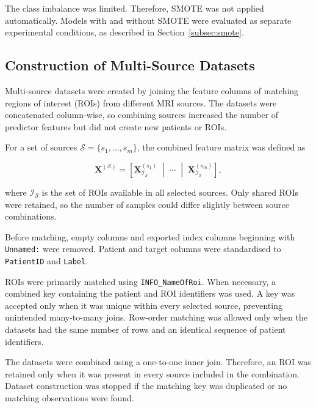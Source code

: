 \documentclass[12pt,twocolumn]{article}
\begin{document}
The class imbalance was limited. Therefore, SMOTE was not applied
automatically. Models with and without SMOTE were evaluated as separate
experimental conditions, as described in
Section~\ref{subsec:smote}.







\subsection{Construction of Multi-Source Datasets}
\label{subsec:multisource_construction}

Multi-source datasets were created by joining the feature columns of
matching regions of interest (ROIs) from different MRI sources. The
datasets were concatenated column-wise, so combining sources increased
the number of predictor features but did not create new patients or
ROIs.

For a set of sources \(\mathcal{S}=\{s_1,\ldots,s_m\}\), the combined
feature matrix was defined as

\begin{equation}
\mathbf{X}^{(\mathcal{S})}
=
\left[
\mathbf{X}^{(s_1)}_{\mathcal{I}_{\mathcal{S}}}
\;\middle|\;
\cdots
\;\middle|\;
\mathbf{X}^{(s_m)}_{\mathcal{I}_{\mathcal{S}}}
\right],
\label{eq:multisource_concatenation}
\end{equation}

where \(\mathcal{I}_{\mathcal{S}}\) is the set of ROIs available in
all selected sources. Only shared ROIs were retained, so the number of
samples could differ slightly between source combinations.

Before matching, empty columns and exported index columns beginning
with \texttt{Unnamed:} were removed. Patient and target columns were
standardised to \texttt{PatientID} and \texttt{Label}.

ROIs were primarily matched using \texttt{INFO\_NameOfRoi}. When
necessary, a combined key containing the patient and ROI identifiers
was used. A key was accepted only when it was unique within every
selected source, preventing unintended many-to-many joins. Row-order
matching was allowed only when the datasets had the same number of
rows and an identical sequence of patient identifiers.

The datasets were combined using a one-to-one inner join. Therefore,
an ROI was retained only when it was present in every source included
in the combination. Dataset construction was stopped if the matching
key was duplicated or no matching observations were found.
\end{document}

